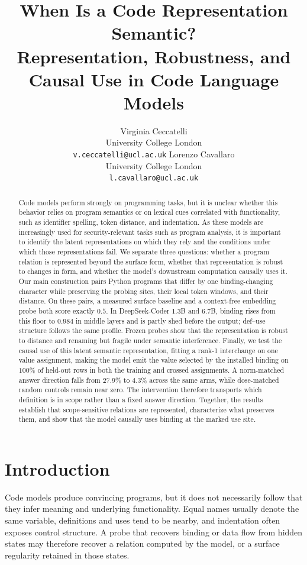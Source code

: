 \documentclass{article}
\title{When Is a Code Representation Semantic?\\
Representation, Robustness, and Causal Use in Code Language Models}
\author{
  Virginia Ceccatelli \\
  University College London \\
  \texttt{v.ceccatelli@ucl.ac.uk}
  \And
  Lorenzo Cavallaro \\
  University College London \\
  \texttt{l.cavallaro@ucl.ac.uk}
}
\begin{document}
\maketitle

\begin{abstract}
Code models perform strongly on programming tasks, but it is unclear whether this behavior relies on program semantics or on lexical cues correlated with functionality, such as identifier spelling, token distance, and indentation. As these models are increasingly used for security-relevant tasks such as program analysis, it is important to identify the latent representations on which they rely and the conditions under which those representations fail. We separate three questions: whether a program relation is represented beyond the surface form, whether that representation is robust to changes in form, and whether the model's downstream computation causally uses it. Our main construction pairs Python programs that differ by one binding-changing character while preserving the probing sites, their local token windows, and their distance. On these pairs, a measured surface baseline and a context-free embedding probe both score exactly $0.5$. In DeepSeek-Coder 1.3B and 6.7B, binding rises from this floor to $0.984$ in middle layers and is partly shed before the output; def--use structure follows the same profile. Frozen probes show that the representation is robust to distance and renaming but fragile under semantic interference. Finally, we test the causal use of this latent semantic representation, fitting a rank-1 interchange on one value assignment, making the model emit the value selected by the installed binding on $100\%$ of held-out rows in both the training and crossed assignments. A norm-matched answer direction falls from $27.9\%$ to $4.3\%$ across the same arms, while dose-matched random controls remain near zero. The intervention therefore transports which definition is in scope rather than a fixed answer direction. Together, the results establish that scope-sensitive relations are represented, characterize what preserves them, and show that the model causally uses binding at the marked use site.
\end{abstract}

\section{Introduction}
\label{sec:intro}

Code models produce convincing programs, but it does not necessarily follow that they infer meaning and underlying functionality. Equal names usually denote the same variable, definitions and uses tend to be nearby, and indentation often exposes control structure. A probe that recovers binding or data flow from hidden states may therefore recover a relation computed by the model, or a surface regularity retained in those states.
\end{document}
